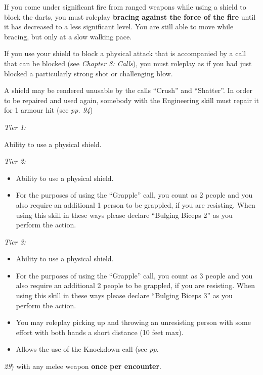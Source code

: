 If you come under significant fire from ranged weapons while using a shield to block the darts, you must roleplay \textbf{bracing against the force of the fire} until it has decreased to a less significant level. You are still able to move while bracing, but only at a slow walking pace.

If you use your shield to block a physical attack that is accompanied by a call that can be blocked (see \textit{Chapter 8: Calls}), you must roleplay as if you had just blocked a particularly strong shot or challenging blow.

A shield may be rendered unusable by the calls ``Crush'' and ``Shatter''. In order to be repaired and used again, somebody with the Engineering skill must repair it for 1 armour hit (see \textit{pp. 94})

\textit{Tier 1:}

Ability to use a physical shield.

\textit{Tier 2:}

\begin{itemize}
\item Ability to use a physical shield.

\item For the purposes of using the ``Grapple'' call, you count as 2 people and you also require an additional 1 person to be grappled, if you are resisting. When using this skill in these ways please declare ``Bulging Biceps 2'' as you perform the action.

\end{itemize}
\textit{Tier 3:}

\begin{itemize}
\item Ability to use a physical shield.

\item For the purposes of using the ``Grapple'' call, you count as 3 people and you also require an additional 2 people to be grappled, if you are resisting. When using this skill in these ways please declare ``Bulging Biceps 3'' as you perform the action.

\item You may roleplay picking up and throwing an unresisting person with some effort with both hands a short distance (10 feet max).

\item Allows the use of the Knockdown call (see \textit{pp.}

\end{itemize}
\textit{29}) with any melee weapon \textbf{once per encounter}.

